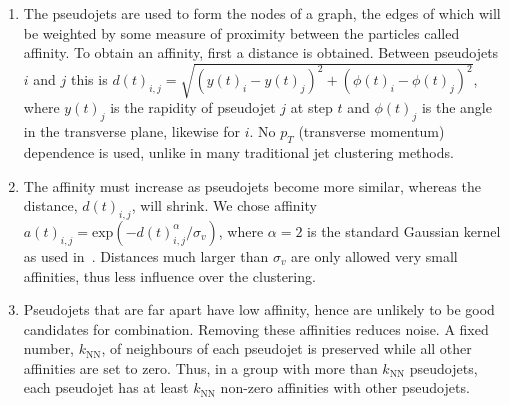    \begin{enumerate}
        \item \label{step:start} The pseudojets are used to form the nodes of a graph,
        the edges of which will be weighted by some measure of proximity between the particles called affinity.
        To obtain an affinity, first a distance is obtained.
        Between pseudojets \(i\) and \(j\) this is \(d(t)_{i,j} = \sqrt{(y(t)_i - y(t)_j)^2 + (\phi(t)_i - \phi(t)_j)^2}\),
        where \(y(t)_j\) is the rapidity of pseudojet \(j\) at step \(t\) and \(\phi(t)_j\) is the angle in the transverse plane, likewise for \(i\).
        No \(p_T\) (transverse momentum) dependence is used, unlike in many traditional jet clustering methods.

    \item \label{step:affinity} The affinity must increase as pseudojets become more similar,
        whereas the distance, \(d(t)_{i,j}\), will shrink.
        We chose affinity \(a(t)_{i,j} = \text{exp}(-d(t)_{i,j}^\alpha/\sigma_v)\),
        where $\alpha=2$ is the standard Gaussian kernel as
        used in~\cite{Belkin:2003_unfound4}.
            Distances much larger than \(\sigma_v\) are only allowed very small affinities,
            thus less influence over the clustering.

    \item\label{step:KNN} Pseudojets that are far apart have low affinity,
        hence are unlikely to be good candidates for combination.
        Removing these affinities reduces noise.
    A fixed number, \(k_\text{NN}\), of neighbours of each pseudojet is 
    preserved while all other affinities are set to zero.
    Thus, in a group with more than \(k_\text{NN}\) pseudojets,
    each pseudojet has at least \(k_\text{NN}\) non-zero affinities with other pseudojets.


\end{enumerate}

